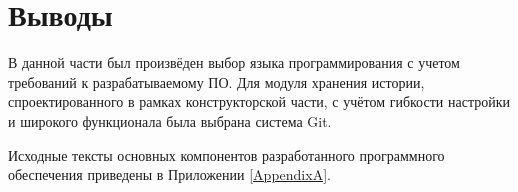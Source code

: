 \section{Выводы} \label{technologic_conclusion}

В данной части был произвёден выбор языка программирования с учетом требований к разрабатываемому ПО.
Для модуля хранения истории, спроектированного в рамках конструкторской части, с учётом гибкости настройки и широкого функционала была выбрана система Git.

\vspace{\baselineskip}
Исходные тексты основных компонентов разработанного программного обеспечения приведены в Приложении \ref{AppendixA}.